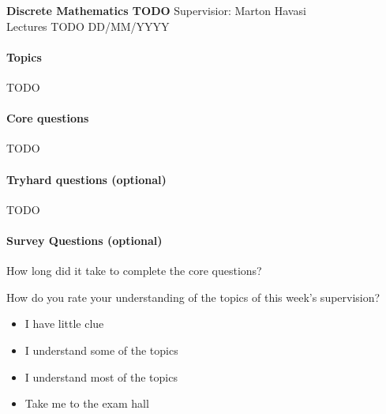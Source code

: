 \documentclass{exam}
\begin{document}
\noindent
\large\textbf{Discrete Mathematics TODO} \hfill Supervisior: Marton Havasi \\
\normalsize Lectures TODO \hfill DD/MM/YYYY
\paragraph{Topics}

TODO

\paragraph{Core questions}
\begin{questions}
\question TODO
\end{questions}

\paragraph{Tryhard questions (optional)}
\begin{questions}
\question TODO
\end{questions}

\paragraph{Survey Questions (optional)}
\begin{questions}
\question How long did it take to complete the core questions?
 
\question How do you rate your understanding of the topics of this week's supervision?

\begin{itemize}
\item
I have little clue
\item 
I understand some of the topics
\item
I understand most of the topics
\item
Take me to the exam hall
\end{itemize}
\end{questions}
\end{document}
